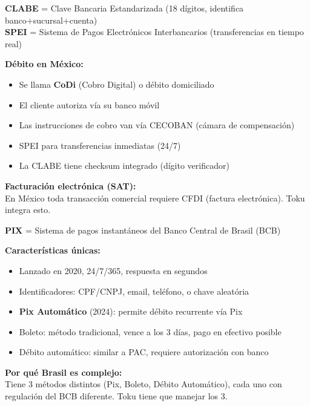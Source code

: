 \documentclass[11pt,a4paper]{article}
\begin{document}
\vspace{8pt}

\begin{mxbox}
\textbf{CLABE} = Clave Bancaria Estandarizada (18 dígitos, identifica banco+sucursal+cuenta)\\
\textbf{SPEI} = Sistema de Pagos Electrónicos Interbancarios (transferencias en tiempo real)

\vspace{6pt}
\textbf{Débito en México:}
\begin{itemize}
  \item Se llama \textbf{CoDi} (Cobro Digital) o débito domiciliado
  \item El cliente autoriza vía su banco móvil
  \item Las instrucciones de cobro van vía CECOBAN (cámara de compensación)
  \item SPEI para transferencias inmediatas (24/7)
  \item La CLABE tiene checksum integrado (dígito verificador)
\end{itemize}

\textbf{Facturación electrónica (SAT):}\\
En México toda transacción comercial requiere CFDI (factura electrónica). Toku integra esto.
\end{mxbox}

\vspace{8pt}

\begin{brbox}
\textbf{PIX} = Sistema de pagos instantáneos del Banco Central de Brasil (BCB)

\vspace{6pt}
\textbf{Características únicas:}
\begin{itemize}
  \item Lanzado en 2020, 24/7/365, respuesta en segundos
  \item Identificadores: CPF/CNPJ, email, teléfono, o chave aleatória
  \item \textbf{Pix Automático} (2024): permite débito recurrente vía Pix
  \item Boleto: método tradicional, vence a los 3 días, pago en efectivo posible
  \item Débito automático: similar a PAC, requiere autorización con banco
\end{itemize}

\textbf{Por qué Brasil es complejo:}\\
Tiene 3 métodos distintos (Pix, Boleto, Débito Automático), cada uno con
regulación del BCB diferente. Toku tiene que manejar los 3.
\end{brbox}
\end{document}
